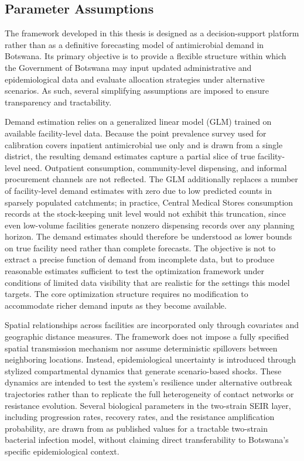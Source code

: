 \documentclass{article}
\begin{document}
\subsection{Parameter Assumptions}

The framework developed in this thesis is designed as a decision-support platform rather than as a definitive forecasting model of antimicrobial demand in Botswana. Its primary objective is to provide a flexible structure within which the Government of Botswana may input updated administrative and epidemiological data and evaluate allocation strategies under alternative scenarios. As such, several simplifying assumptions are imposed to ensure transparency and tractability.

Demand estimation relies on a generalized linear model (GLM) trained on available facility-level data. Because the point prevalence survey used for calibration covers inpatient antimicrobial use only and is drawn from a single district, the resulting demand estimates capture a partial slice of true facility-level need. Outpatient consumption, community-level dispensing, and informal procurement channels are not reflected. The GLM additionally replaces a number of facility-level demand estimates with zero due to low predicted counts in sparsely populated catchments; in practice, Central Medical Stores consumption records at the stock-keeping unit level would not exhibit this truncation, since even low-volume facilities generate nonzero dispensing records over any planning horizon. The demand estimates should therefore be understood as lower bounds on true facility need rather than complete forecasts. The objective is not to extract a precise function of demand from incomplete data, but to produce reasonable estimates sufficient to test the optimization framework under conditions of limited data visibility that are realistic for the settings this model targets. The core optimization structure requires no modification to accommodate richer demand inputs as they become available.

Spatial relationships across facilities are incorporated only through covariates and geographic distance measures. The framework does not impose a fully specified spatial transmission mechanism nor assume deterministic spillovers between neighboring locations. Instead, epidemiological uncertainty is introduced through stylized compartmental dynamics that generate scenario-based shocks. These dynamics are intended to test the system's resilience under alternative outbreak trajectories rather than to replicate the full heterogeneity of contact networks or resistance evolution. Several biological parameters in the two-strain SEIR layer, including progression rates, recovery rates, and the resistance amplification probability, are drawn from \cite{kd20} as published values for a tractable two-strain bacterial infection model, without claiming direct transferability to Botswana's specific epidemiological context.
\end{document}
